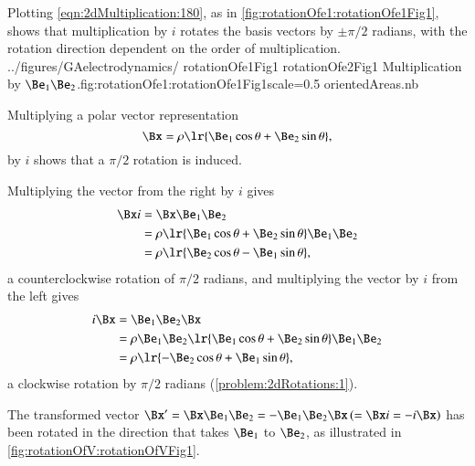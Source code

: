%
%
Plotting \cref{eqn:2dMultiplication:180}, as in
\cref{fig:rotationOfe1:rotationOfe1Fig1},
 shows that multiplication by \( i \) rotates the  basis vectors by \( \pm \pi/2 \) radians,
with the
rotation direction dependent on the order of multiplication.
\pmathImageTwoFigures
{../figures/GAelectrodynamics/}
{rotationOfe1Fig1}
{rotationOfe2Fig1}
{Multiplication by \( \Be_1 \Be_2 \).}{fig:rotationOfe1:rotationOfe1Fig1}{scale=0.5}
{orientedAreas.nb}

Multiplying a polar vector representation
\begin{equation}\label{eqn:2dRotations:280}
   \Bx = \rho \lr{ \Be_1 \cos\theta + \Be_2 \sin\theta },
\end{equation}
by \( i \) shows that a \( \pi/2 \) rotation is induced.

Multiplying the vector from the right by \( i \) gives
\begin{equation}\label{eqn:2dRotations:300}
\begin{aligned}
\Bx i
&= \Bx \Be_1 \Be_2 \\
&= \rho \lr{ \Be_1 \cos\theta + \Be_2 \sin\theta } \Be_1 \Be_2 \\
&= \rho \lr{ \Be_2 \cos\theta - \Be_1 \sin\theta },
\end{aligned}
\end{equation}
a counterclockwise rotation of \( \pi/2 \) radians, and
multiplying the vector by \( i \) from the left gives
\begin{equation}\label{eqn:2dRotations:3}
\begin{aligned}
i \Bx
&= \Be_1 \Be_2 \Bx \\
&= \rho \Be_1 \Be_2 \lr{ \Be_1 \cos\theta + \Be_2 \sin\theta } \Be_1 \Be_2 \\
&= \rho \lr{ -\Be_2 \cos\theta + \Be_1 \sin\theta },
\end{aligned}
\end{equation}
a clockwise rotation by \( \pi/2 \) radians
(\cref{problem:2dRotations:1}).

The transformed vector \( \Bx' = \Bx \Be_1 \Be_2 = -\Be_1 \Be_2 \Bx \,(= \Bx i = -i \Bx) \) has been rotated in the direction that takes \( \Be_1 \) to \( \Be_2 \), as illustrated
in \cref{fig:rotationOfV:rotationOfVFig1}.

